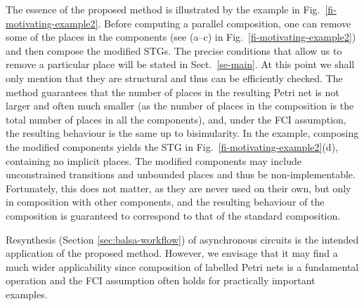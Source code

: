 The essence of the proposed method is illustrated by the example in Fig.~\ref{fi-motivating-example2}. Before computing a parallel composition, one can remove some of the places in the components (see (a--c) in Fig.~\ref{fi-motivating-example2}) and then compose the modified STGs. The precise conditions that allow us to remove a particular place will be stated in Sect.~\ref{se-main}. At this point we shall only mention that they are structural and thus can be efficiently checked. The method  guarantees that the number of places in the resulting Petri net is not larger and often much smaller (as the number of places in the composition is the total number of places in all the components), and, under the FCI assumption, the resulting behaviour is the same up to bisimularity. In the example, composing the modified components yields the STG in Fig.~\ref{fi-motivating-example2}(d), containing no implicit places. The modified components  may include unconstrained transitions and unbounded places and thus be non-implementable. Fortunately, this does not matter, as they are never used on their own, but only in composition with other components, and the resulting behaviour of the composition is guaranteed to correspond to that of the standard composition.

Resynthesis (Section \ref{sec:balsa-workflow}) of asynchronous circuits is the intended application of the proposed method. However, we envisage that it may find a much wider applicability since composition of labelled Petri nets is a fundamental operation and the FCI assumption often holds for practically important examples.

